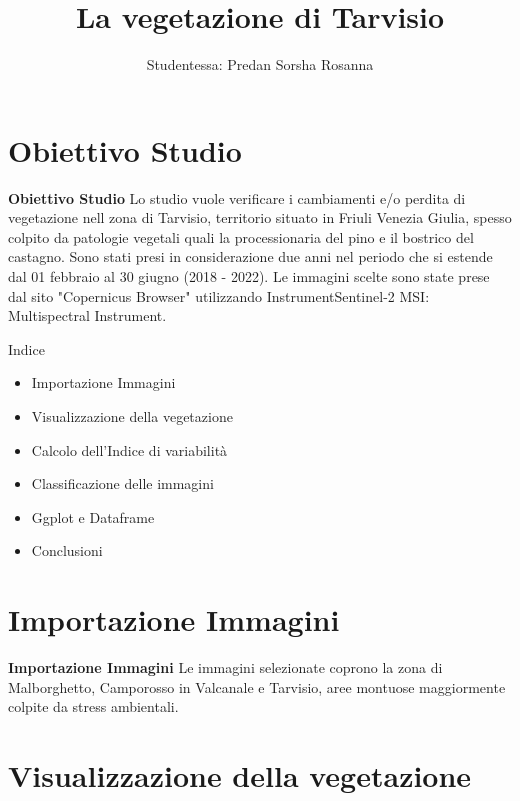 \documentclass{beamer}
\title{\Large\textbf{La vegetazione di Tarvisio}}
\author{Studentessa: Predan Sorsha Rosanna }
\begin{document}
\maketitle

\AtBeginSection[] 


\section{Obiettivo Studio}

\begin{frame}
{\Large\textbf{Obiettivo Studio}}
 Lo studio vuole verificare i cambiamenti e/o perdita di vegetazione nell zona di Tarvisio, territorio situato in Friuli Venezia Giulia, spesso colpito da patologie vegetali quali la processionaria del pino e il bostrico del castagno. Sono stati presi in considerazione due anni nel periodo che si estende dal 01 febbraio al 30 giugno (2018 - 2022). Le immagini scelte sono state prese dal sito "Copernicus Browser" utilizzando InstrumentSentinel-2 MSI: Multispectral Instrument.
\end{frame}

\begin{frame}{Indice}
 \begin{itemize}
     \item Importazione Immagini
     \item Visualizzazione della vegetazione
     \item Calcolo dell'Indice di variabilità
     \item Classificazione delle immagini
     \item Ggplot e Dataframe
     \item Conclusioni
 \end{itemize}
\end{frame}

\section{Importazione Immagini}

\begin{frame}
{\Large\textbf{Importazione Immagini}}
Le immagini selezionate coprono la zona di Malborghetto, Camporosso in Valcanale e Tarvisio, aree montuose maggiormente colpite da stress ambientali.
\end{frame}

\section{Visualizzazione della vegetazione}
\end{document}
